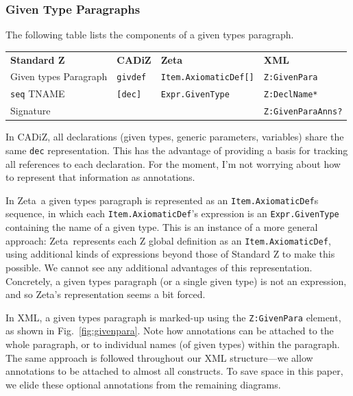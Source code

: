 \documentclass{llncs}  %
\newcommand{\AFont}[1]{\texttt{#1}}
\newcommand{\CADiZ}{CADiZ}
\newcommand{\Zeta}{Zeta}
\newcommand{\AParagraph}{Paragraph}
\newcommand{\TNAME}{TNAME}
\newcommand{\ASignature}{Signature}
\begin{document}
\subsubsection{Given Type Paragraphs}\label{giventypes}

The following table lists the components of a given types paragraph.

\begin{center}
\begin{tabular}{|l|l|l|l|}
\hline
{\bf Standard Z} & {\bf \CADiZ} & {\bf \Zeta} & {\bf XML}\\
Given types \AParagraph & \AFont{givdef} & \AFont{Item.AxiomaticDef[]} & \AFont{Z:GivenPara}\\
\hline
\AFont{seq} \TNAME & \AFont{[dec]} & \AFont{Expr.GivenType} & \AFont{Z:DeclName*}\\
\ASignature & & & \AFont{Z:GivenParaAnns?}\\
\hline
\end{tabular}
\end{center}

In \CADiZ, all declarations
(given types, generic parameters, variables)
share the same \AFont{dec} representation.
This has the advantage of providing a basis for
tracking all references to each declaration.
For the moment, I'm not worrying about
how to represent that information as annotations.

In \Zeta\ a given types paragraph is represented as
an \AFont{Item.AxiomaticDef}s sequence,
in which each \AFont{Item.AxiomaticDef}'s expression
is an \AFont{Expr.GivenType} containing the name of a given type.
This is an instance of a more general approach:
\Zeta\ represents each Z global definition as an \AFont{Item.AxiomaticDef},
using additional kinds of expressions beyond those of Standard Z
to make this possible.
We cannot see any additional advantages of this representation.
Concretely, a given types paragraph (or a single given type) is not an
expression, and so \Zeta's representation seems a bit forced. 

In XML, a given types paragraph is marked-up using
the \AFont{Z:GivenPara} element, as shown in Fig.~\ref{fig:givenpara}.
Note how annotations can be attached to the whole paragraph,
or to individual names (of given types) within the paragraph.
The same approach is followed throughout our XML structure---we allow
annotations to be attached to almost all constructs.  To save space in this
paper, we elide these optional annotations from the remaining diagrams.
\end{document}
